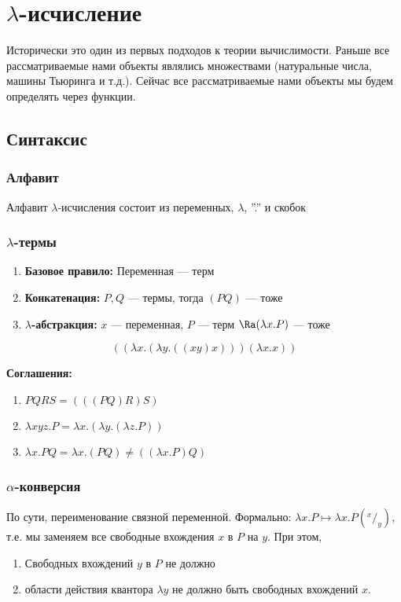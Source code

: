 
\section{\(\lambda\)-исчисление}
Исторически это один из первых подходов к теории вычислимости. Раньше все рассматриваемые нами объекты являлись множествами (натуральные числа, машины Тьюринга и т.д.). Сейчас все рассматриваемые нами объекты мы будем определять через функции.

\subsection{Синтаксис}
\subsubsection{Алфавит}
Алфавит \(\lambda\)-исчисления состоит из переменных, \(\lambda\), ''.'' и скобок

\subsubsection{\(\lambda\)-термы}
\begin{enumerate}
    \item[] \textbf{Базовое правило:} Переменная --- терм
    \item[] \textbf{Конкатенация:} \(P, Q\) --- термы, тогда \((PQ)\) --- тоже
    \item[] \textbf{\(\lambda\)-абстракция:} \(x\) --- переменная, \(P\) --- терм \(\Ra (\lambda x . P)\) --- тоже
\end{enumerate}

\begin{example}
    \[((\lambda x.(\lambda y. ((xy)x)))(\lambda x.x))\]
\end{example}

\textbf{Соглашения:} 
\begin{enumerate}
    \item \(PQRS = (((PQ)R)S)\)
    \item \(\lambda xyz.P = \lambda x.(\lambda y.(\lambda z.P))\)
    \item \(\lambda x.PQ = \lambda x.(PQ) \ne ((\lambda x.P)Q)\)
\end{enumerate}

\subsubsection{\(\alpha\)-конверсия}
По сути, переименование связной переменной. Формально: \(\lambda x.P \mapsto \lambda x.P(^x/_y)\), т.е. мы заменяем все свободные вхождения \(x\) в \(P\) на \(y\). При этом, 
\begin{enumerate}
    \item Свободных вхождений \(y\) в \(P\) не должно 
    \item области действия квантора \(\lambda y\) не должно быть свободных вхождений \(x\).
\end{enumerate}

